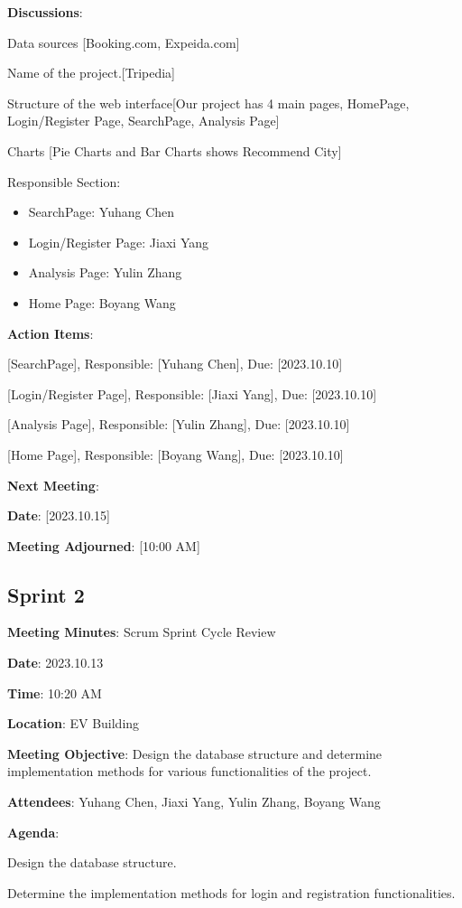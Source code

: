 \documentclass[conference]{IEEEtran}
\begin{document}
\textbf{Discussions}:

Data sources [Booking.com, Expeida.com]

Name of the project.[Tripedia]

Structure of the web interface[Our project has 4 main pages, HomePage, Login/Register Page, SearchPage, Analysis Page]

Charts [Pie Charts and Bar Charts shows Recommend City]

Responsible Section:
\begin{itemize}
\item SearchPage: Yuhang Chen
\item Login/Register Page: Jiaxi Yang
\item Analysis Page: Yulin Zhang
\item Home Page: Boyang Wang
\end{itemize}
\textbf{Action Items}:

[SearchPage], Responsible: [Yuhang Chen], Due: [2023.10.10]

[Login/Register Page], Responsible: [Jiaxi Yang], Due: [2023.10.10]

[Analysis Page], Responsible: [Yulin Zhang], Due: [2023.10.10]

[Home Page], Responsible: [Boyang Wang], Due: [2023.10.10]

\textbf{Next Meeting}:

\textbf{Date}: [2023.10.15]

\textbf{Meeting Adjourned}: [10:00 AM]

\subsection*{Sprint 2}

\textbf{Meeting Minutes}: Scrum Sprint Cycle Review

\textbf{Date}: 2023.10.13

\textbf{Time}: 10:20 AM

\textbf{Location}: EV Building

\textbf{Meeting Objective}: Design the database structure and determine implementation methods for various functionalities of the project.

\textbf{Attendees}: Yuhang Chen, Jiaxi Yang, Yulin Zhang, Boyang Wang

\textbf{Agenda}:

Design the database structure.

Determine the implementation methods for login and registration functionalities.
\end{document}
